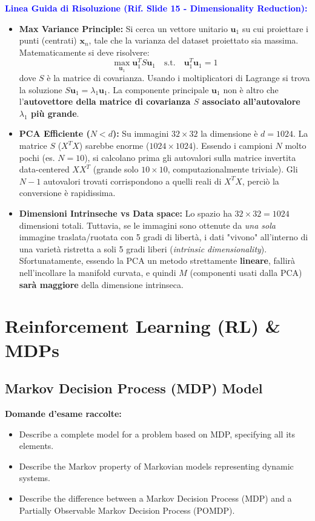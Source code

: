 \documentclass[11pt,a4paper]{article}
\begin{document}
\textbf{\textcolor{blue}{Linea Guida di Risoluzione (Rif. Slide 15 - Dimensionality Reduction):}}
\begin{itemize}
    \item \textbf{Max Variance Principle:} Si cerca un vettore unitario $\mathbf{u}_1$ su cui proiettare i punti (centrati) $\mathbf{x}_n$, tale che la varianza del dataset proiettato sia massima. Matematicamente si deve risolvere:
    $$ \max_{\mathbf{u}_1} \mathbf{u}_1^T S \mathbf{u}_1 \quad \text{s.t.} \quad \mathbf{u}_1^T \mathbf{u}_1 = 1 $$
    dove $S$ è la matrice di covarianza. Usando i moltiplicatori di Lagrange si trova la soluzione $S\mathbf{u}_1 = \lambda_1\mathbf{u}_1$. La componente principale $\mathbf{u}_1$ non è altro che l'\textbf{autovettore della matrice di covarianza $S$ associato all'autovalore $\lambda_1$ più grande}.
    \item \textbf{PCA Efficiente ($N < d$):} Su immagini $32 \times 32$ la dimensione è $d=1024$. La matrice $S$ ($X^T X$) sarebbe enorme ($1024 \times 1024$). Essendo i campioni $N$ molto pochi (es. $N=10$), si calcolano prima gli autovalori sulla matrice invertita data-centered $XX^T$ (grande solo $10 \times 10$, computazionalmente triviale). Gli $N-1$ autovalori trovati corrispondono a quelli reali di $X^T X$, perciò la conversione è rapidissima.
    \item \textbf{Dimensioni Intrinseche vs Data space:} Lo spazio ha $32 \times 32 = 1024$ dimensioni totali. Tuttavia, se le immagini sono ottenute da \textit{una sola} immagine traslata/ruotata con 5 gradi di libertà, i dati "vivono" all'interno di una varietà ristretta a soli 5 gradi liberi (\textit{intrinsic dimensionality}). Sfortunatamente, essendo la PCA un metodo strettamente \textbf{lineare}, fallirà nell'incollare la manifold curvata, e quindi $M$ (componenti usati dalla PCA) \textbf{sarà maggiore} della dimensione intrinseca.
\end{itemize}


\section{Reinforcement Learning (RL) \& MDPs}

\subsection{Markov Decision Process (MDP) Model}
\textbf{Domande d'esame raccolte:}
\begin{itemize}
    \item Describe a complete model for a problem based on MDP, specifying all its elements.
    \item Describe the Markov property of Markovian models representing dynamic systems.
    \item Describe the difference between a Markov Decision Process (MDP) and a Partially Observable Markov Decision Process (POMDP).
\end{itemize}
\end{document}
